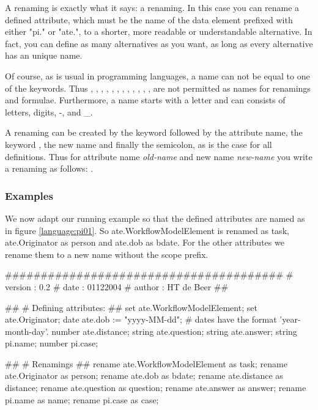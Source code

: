 A renaming is exactly what it says: a renaming. In this case you can rename a
defined attribute, which must be the name of the data element prefixed with
either "pi." or "ate.", to a shorter, more readable or understandable
alternative. In fact, you can define as many alternatives as you want, as long
as every alternative has an unique name.

\label{language:name}
Of course, as is usual in programming languages, a name can not be equal to
one of the keywords. Thus , , , ,
, , , , , , ,
,  are not permitted as names for renamings and
formulae. Furthermore, a name starts with a letter and can consists of letters, digits, -, and \_. 

A renaming can be created by the keyword  followed by the
attribute name, the keyword , the new name and finally the semicolon,
as is the case for all definitions. Thus for attribute name \textit{old-name}
and new name \textit{new-name} you write a renaming as follows: .

\subsubsection{Examples}

We now adapt our running example so that the defined attributes are named as
in figure \ref{language:pi01}. So ate.WorkflowModelElement is renamed as task,
ate.Originator as person and ate.dob as bdate. For the other attributes
we rename them to a new name without the scope prefix.

\begin{ltlcode}
#######################################
# version : 0.2
# date : 01122004
# author : HT de Beer
##

## 
# Defining attributes:
##
set ate.WorkflowModelElement;
set ate.Originator;
date ate.dob := "yyyy-MM-dd"; # dates have the format 'year-month-day'.
number ate.distance;
string ate.question;
string ate.answer;
string pi.name;
number pi.case;

##
# Renamings
##
rename ate.WorkflowModelElement as task;
rename ate.Originator as person;
rename ate.dob as bdate;
rename ate.distance as distance;
rename ate.question as question;
rename ate.answer as answer;
rename pi.name as name;
rename pi.case as case;
\end{ltlcode}

